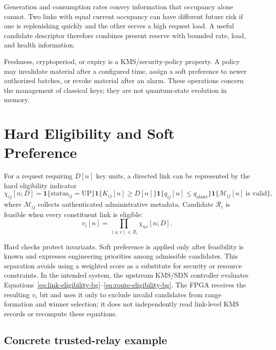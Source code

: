 Generation and consumption rates convey information that occupancy alone cannot.
Two links with equal current occupancy can have different future risk if one is
replenishing quickly and the other serves a high request load. A useful candidate
descriptor therefore combines present reserve with bounded rate, load, and health
information.

Freshness, cryptoperiod, or expiry is a KMS/security-policy property. A policy may
invalidate material after a configured time, assign a soft preference to newer
authorized batches, or revoke material after an alarm. These operations concern the
management of classical keys; they are not quantum-state evolution in memory.

\section{Hard Eligibility and Soft Preference}

For a request requiring $D[n]$ key units, a directed link can be represented by the
hard eligibility indicator
\begin{equation}
\chi_{ij}[n;D]
=\mathbf{1}\{\mathrm{status}_{ij}=\mathrm{UP}\}
 \mathbf{1}\{K_{ij}[n]\geq D[n]\}
 \mathbf{1}\{q_{ij}[n]\leq q_{\mathrm{abort}}\}
 \mathbf{1}\{\mathcal{M}_{ij}[n]\ \text{is valid}\},
\label{eq:link-eligibility-bg}
\end{equation}
where $\mathcal{M}_{ij}$ collects authenticated administrative metadata. Candidate
$\mathcal{R}_i$ is feasible when every constituent link is eligible:
\begin{equation}
v_i[n]=\prod_{(u,v)\in\mathcal{R}_i}\chi_{uv}[n;D].
\label{eq:route-eligibility-bg}
\end{equation}

Hard checks protect invariants. Soft preference is applied only after feasibility is
known and expresses engineering priorities among admissible candidates. This
separation avoids using a weighted score as a substitute for security or resource
constraints. In the intended system, the upstream KMS/SDN controller evaluates
Equations~\eqref{eq:link-eligibility-bg}--\eqref{eq:route-eligibility-bg}. The FPGA
receives the resulting $v_i$ bit and uses it only to exclude invalid candidates from
range formation and winner selection; it does not independently read link-level KMS
records or recompute these equations.

\subsection{Concrete trusted-relay example}

